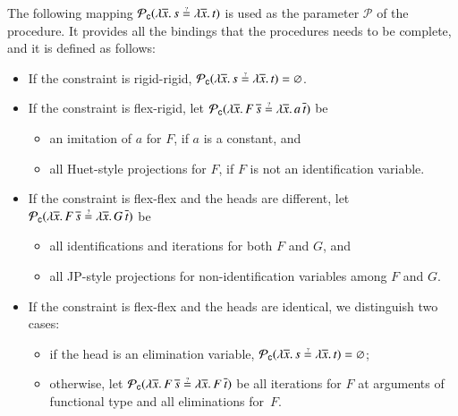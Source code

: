 \noindent
The following mapping $\mathcal{P}_\mathsf{c}(\lambda \overline{x}.
\, s \unif \lambda \overline{x}. \, t)$ is used as the parameter $\mathcal{P}$ of the procedure.
It provides all the bindings that the procedures needs to be complete, and it is defined as follows:
\begin{itemize}
  \setlength\itemsep{1\jot}

    \item If the constraint is rigid-rigid, $\mathcal{P}_\mathsf{c}(\lambda \overline{x}.
    \, s \unif \lambda \overline{x}. \, t) = \varnothing$.

    \item If the constraint is flex-rigid,
    let 
    $\mathcal{P}_\mathsf{c}(\lambda \overline{x}. \, F \,\overline{s} \unif \lambda \overline{x}. \, a\, \overline{t})$ 
    be 
    \begin{itemize}
        \item an imitation of $a$ for $F$, if $a$ is a constant, and
        \item all Huet-style projections for $F$, if $F$ is not an identification variable.
    \end{itemize}
    
    \item If the constraint is flex-flex and the heads are different,
    let 
    $\mathcal{P}_\mathsf{c}(\lambda \overline{x}. \, F \,\overline{s} \unif \lambda \overline{x}. \, G\, \overline{t})$ 
    be 
    \begin{itemize}
        \item all identifications and iterations for both $F$ and $G$, and
        \item all JP-style projections for non-identification variables among $F$ and $G$.
    \end{itemize}
    
    \item If the constraint is flex-flex and the heads are identical,
    we distinguish two cases:
    \begin{itemize}
        \item if the head is an elimination variable, 
        $\mathcal{P}_\mathsf{c}(\lambda \overline{x}.\, s \unif \lambda \overline{x}.\, t ) = \varnothing$;
        \item otherwise, let 
        $\mathcal{P}_\mathsf{c}(\lambda \overline{x}. \, F \,\overline{s} \unif \lambda \overline{x}. \, F\, \overline{t})$ 
        be all iterations for $F$ at arguments of functional type and
        all eliminations for~$F$.
    \end{itemize}
\end{itemize}

